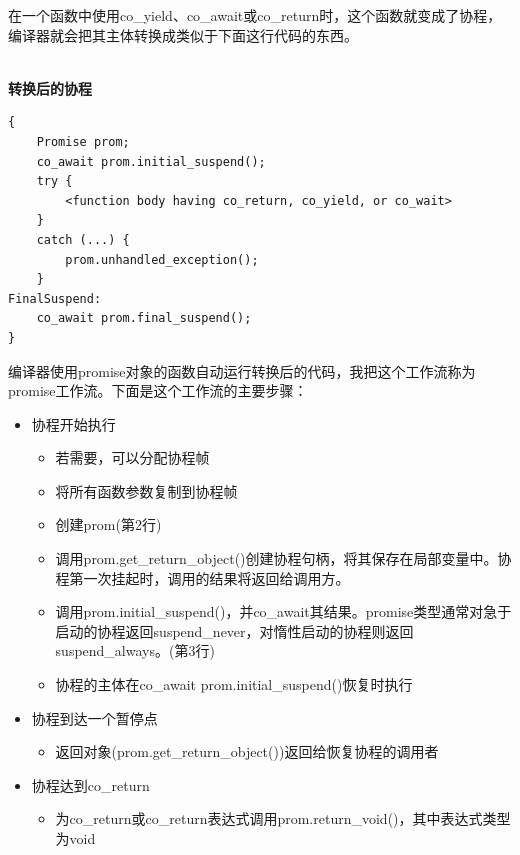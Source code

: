 在一个函数中使用co\_yield、co\_await或co\_return时，这个函数就变成了协程，编译器就会把其主体转换成类似于下面这行代码的东西。

\hspace*{\fill} \\ %
\noindent
\textbf{转换后的协程}
\begin{lstlisting}[style=styleCXX]
{
	Promise prom;
	co_await prom.initial_suspend();
	try {
		<function body having co_return, co_yield, or co_wait>
	}
	catch (...) {
		prom.unhandled_exception();
	}
FinalSuspend:
	co_await prom.final_suspend();
}
\end{lstlisting}

编译器使用promise对象的函数自动运行转换后的代码，我把这个工作流称为promise工作流。下面是这个工作流的主要步骤：

\begin{itemize}
\item 
协程开始执行

\begin{itemize}
\item 
若需要，可以分配协程帧

\item 
将所有函数参数复制到协程帧

\item 
创建prom(第2行)

\item 
调用prom.get\_return\_object()创建协程句柄，将其保存在局部变量中。协程第一次挂起时，调用的结果将返回给调用方。

\item 
调用prom.initial\_suspend()，并co\_await其结果。promise类型通常对急于启动的协程返回suspend\_never，对惰性启动的协程则返回suspend\_always。(第3行)

\item 
协程的主体在co\_await prom.initial\_suspend()恢复时执行
\end{itemize}

\item 
协程到达一个暂停点
\begin{itemize}
\item 
返回对象(prom.get\_return\_object())返回给恢复协程的调用者
\end{itemize}

\item 
协程达到co\_return
\begin{itemize}
\item 
为co\_return或co\_return表达式调用prom.return\_void()，其中表达式类型为void


\end{itemize}
\end{itemize}
